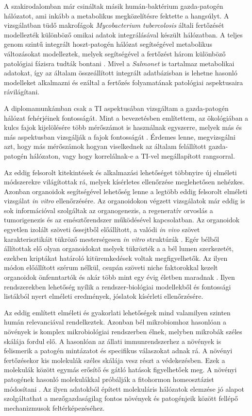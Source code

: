 \documentclass[a4paper,12pt]{article}
\begin{document}
 		A szakirodalomban már csináltak másik humán-baktérium gazda-patogén hálózatot, ami inkább a metabolikus megközelítésre fektette a hangsúlyt. A vizsgálatban tüdő makrofágok \textit{Mycobacterium tubercolosis} általi fertőzését modellezték különböző omikai adatok integrálásával készült hálózatban. A teljes genom szintű integrált hoszt-patogén hálózat segítségével metabolikus változásokat modelleztek, melyek segítségével a fertőzést három különböző patológiai fázisra tudták bontani \cite{discussion_alveolar_macrophage}.  Mivel a \textit{Salmonet} is tartalmaz metabolikai adatokat, így az általam összeállított integrált adatbázisban is lehetne hasonló modelleket alkalmazni és ezáltal a fertőzés folyamatának patológiai aspektusaira rávilágítani.

		A diplomamunkámban csak a TI aspektusában vizsgáltam a gazda-patogén hálózat fehérjéinek fontosságát. Mint a bevezetésben említettem, az ökológiában a kulcs fajok kijelölésére több mérőszámot is használnak egyszerre, melyek más és más aspektusban vizsgálják a fajok fontosságát \cite{jordan_comparison} \cite{ti}. Érdemes lenne, megvizsgálni azt, hogy más mérőszámok hogyan viselkednek az általam felállított gazda-patogén hálózaton, vagy hogy korrelálnak-e a TI-vel megállapított rangsorral.

		Az eddig felsorolt kitekintések és alkalmazási lehetőséget többnyire új elméleti módszerekre világítottak rá, melyek kísérletes ellenőrzése meglehetősen nehézkes. Azonban organoidok segítségével lehetőség lenne a legtöbb eddig felsorolt elméleti vizsgálat \textit{in vitro} ellenőrzésére. Az organoidokon végzett vizsgálatok már eddig is sok információval szolgáltak az organogenezis, a regeneratív orvoslás a tumorigenezis és az emésztőrendszer működésével kapcsolatban. Az organoidok egyetlen izolált szöveti őssejtből előállított, a valódi \textit{in vivo} szövet karakterisztikáit tükröző mesterségesen \textit{in vitro} struktúrák \cite{organoid}.
		Egér bélből állítottak elő olyan organoidokat melyek tükrözték a a bél lumen szerkezetét, ezekben kriptákat határoló kitüremkedések voltak megfigyelhetők. Az ilyen módon előállított szérum nélkül, csupán szöveti niche faktorokkal kezelt organoidok önfenntartók és akár több mint egy évig életben maradnak \cite{organoid}.  Ilyen rendszerekben lehetőség nyílik a rendszer-biológiai modellekből és fontossági listákból nyert elméleti eredmények, jóslatok kísérleti ellenőrzésére.

		Az eddig említett elméleti és gyakorlati lehetőségek mind valamilyen szinten humán relevanciával rendelkeztek. Azonban bél mikrobiomhoz hasonlóan a növények is komplex mikrobiológiai rendszerben élnek, melyben mikrobák széles skálája fordul elő.
		A hasonlóan az állati immunrendszerhez a növények is felismerik a patogén mintázatot és specifikus válaszokat adnak rá. A növényi fertőzésekor kis molekulák széles skálája vesz részt a védekezésben. Ezek a molekulák között egymás erősítő és gátló hatások figyelhetőek meg. A növényi patogének hasonló molekulákkal próbálják a fitohormon homeosztázist módosítani \cite{discussion_plant_network} . Az ilyen adatokból épített molekuláris hálózatok elemzése jó alapot szolgáltathat a mezőgazdaságilag fontos növények és patogénjeik között fellépő mechanizmusok feltérképezéséhez.
\end{document}
